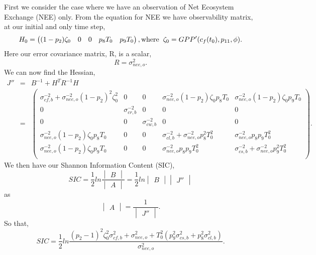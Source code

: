 \documentclass[11pt]{article}
\begin{document}
First we consider the case where we have an observation of Net Ecosystem Exchange (NEE) only. From the equation for NEE we have observability matrix, at our initial and only time step,
\[
H_{0} = \begin{pmatrix}
(1-p_{2})\zeta_0 & 0 & 0 & p_{8}T_{0} & p_{9}T_{0}
\end{pmatrix},\text{where} \hspace{2mm} \zeta_0 = GPP'(c_f(t_0), p_{11}, \phi). 
\]
Here our error covariance matrix, R, is a scalar,
\[
R=\sigma_{nee,o}^{2}.
\]
We can now find the Hessian,
\[
\begin{array} {lcl}
J'' &=& B^{-1}+H^{T}R^{-1}H \\
&=& \begin{pmatrix} 
\sigma_{cf,b}^{-2}+\sigma_{nee,o}^{-2}(1-p_{2})^{2}\zeta_0^{2} & 0 & 0 & \sigma_{nee,o}^{-2}(1-p_{2})\zeta_0 p_{8}T_0 & \sigma_{nee,o}^{-2}(1-p_{2})\zeta_0 p_{9}T_0 \\
0 & \sigma_{cr,b}^{-2} & 0 & 0 & 0 \\
0 & 0 & \sigma_{cw,b}^{-2} & 0 & 0 \\
\sigma_{nee,o}^{-2}(1-p_{2})\zeta_0 p_{8}T_0 & 0 & 0 & \sigma_{cl,b}^{-2}+\sigma_{nee,o}^{-2}p_{8}^2 T_0^2 & \sigma_{nee,o}^{-2}p_{8}p_{9} T_0^2 \\
\sigma_{nee,o}^{-2}(1-p_{2})\zeta_0 p_{9}T_0 & 0 & 0 & \sigma_{nee,o}^{-2}p_{8}p_{9} T_0^2 & \sigma_{cs,b}^{-2}+\sigma_{nee,o}^{-2}p_{9}^2 T_0^2 \\
\end{pmatrix}.
\end{array}
\] 
We then have our Shannon Information Content (SIC),
\[
SIC=\frac{1}{2}ln\frac{\begin{vmatrix} B \end{vmatrix}}{\begin{vmatrix} A \end{vmatrix}} = \frac{1}{2}ln\begin{vmatrix} B \end{vmatrix}\begin{vmatrix} J'' \end{vmatrix}
\]
as
\[
 \begin{vmatrix} A \end{vmatrix} = \frac{1}{\begin{vmatrix} J'' \end{vmatrix}}.
\]
So that,
\[
SIC = \frac{1}{2}ln\frac{(p_{2}-1)^{2}\zeta_0^{2}\sigma_{cf,b}^{2}+\sigma_{nee,o}^{2}+T_{0}^2(p_{9}^2\sigma_{cs,b}^2+p_8^2\sigma_{cl,b}^2)}{\sigma_{nee,o}^{2}}.
\]
\end{document}
